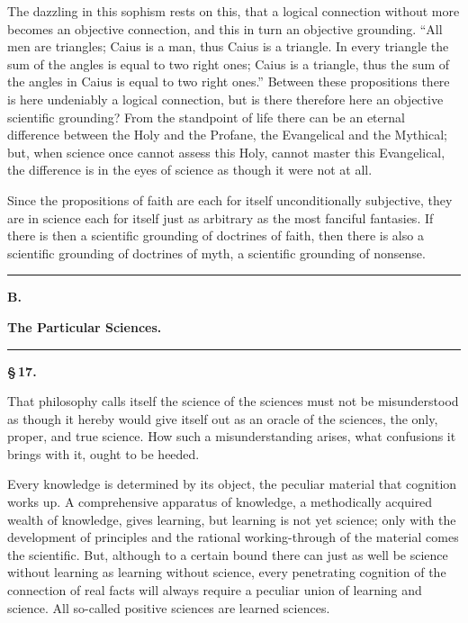 \documentclass[12pt]{book}
\begin{document}
The dazzling in this sophism rests on this, that a logical connection without more becomes
an objective connection, and this in turn an objective grounding. ``All men are triangles;
Caius is a man, thus Caius is a triangle. In every triangle the sum of the angles is equal
to two right ones; Caius is a triangle, thus the sum of the angles in Caius is equal to two
right ones.'' Between these propositions there is here undeniably a logical connection, but
is there therefore here an objective scientific grounding? From the standpoint of life
there can be an eternal difference between the Holy and the Profane, the Evangelical and the
Mythical; but, when science once cannot assess this Holy, cannot master this Evangelical,
the difference is in the eyes of science as though it were not at all.

Since the propositions of faith are each for itself unconditionally subjective, they are in
science each for itself just as arbitrary as the most fanciful fantasies. If there is then a
scientific grounding of doctrines of faith, then there is also a scientific grounding of
doctrines of myth, a scientific grounding of nonsense.

\begin{center}\rule{0.35\linewidth}{0.4pt}\end{center}

\begin{center}
  {\large\bfseries B.}\par\vspace{2pt}
  {\bfseries The Particular Sciences.}\par\vspace{4pt}
  \rule{2cm}{0.4pt}
\end{center}
{}

\begin{center}{\bfseries \S\,17.}\end{center}

That philosophy calls itself the science of the sciences must not be misunderstood as
though it hereby would give itself out as an oracle of the sciences, the only, proper, and
true science. How such a misunderstanding arises, what confusions it brings with it, ought
to be heeded.

Every knowledge is determined by its object, the peculiar material that cognition works up.
A comprehensive apparatus of knowledge, a methodically acquired wealth of knowledge, gives
learning, but learning is not yet science; only with the development of principles and the
rational working-through of the material comes the scientific. But, although to a certain
bound there can just as well be science without learning as learning without science, every
penetrating cognition of the connection of real facts will always require a peculiar union
of learning and science. All so-called positive sciences are learned sciences.
\end{document}
